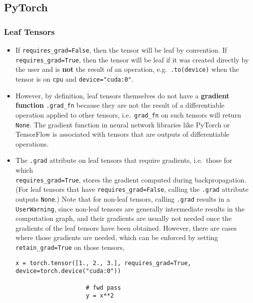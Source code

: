 \documentclass[12pt, a4paper]{article}
\numberwithin{equation}{section}
\theoremstyle{definition}
\theoremstyle{definition}
\begin{document}
	\subsection{PyTorch}
	
		\subsubsection{Leaf Tensors}
			
			\begin{itemize}
				\item If \texttt{requires\_grad=False}, then the tensor will be leaf by convention. If \texttt{requires\_grad=True}, then the tensor will be leaf if it was created directly by the user and is \textbf{not} the result of an operation, e.g.~\texttt{.to(device)} when the tensor is on \texttt{cpu} and \texttt{device="cuda:0"}.
				
				\item However, by definition, leaf tensors themselves do not have a \textbf{gradient function} \texttt{.grad\_fn} \mbox{because} they are not the result of a differentiable operation applied to other tensors, i.e.~\texttt{grad\_fn} on such tensors will return \texttt{None}. The gradient function in neural network libraries like PyTorch or TensorFlow is associated with tensors that are outputs of differentiable operations.
				
				\item The \texttt{.grad} attribute on leaf tensors that require gradients, i.e.~those for which \\ \texttt{requires\_grad=True}, stores the gradient computed during backpropagation. (For leaf tensors that have \texttt{requires\_grad=False}, calling the \texttt{.grad} attribute outputs \texttt{None}.) Note that for non-leaf tensors, calling \texttt{.grad} results in a \texttt{UserWarning}, since non-leaf tensors are generally intermediate results in the computation graph, and their gradients are usually not needed once the gradients of the leaf tensors have been obtained. However, there are cases where those gradients are needed, which can be enforced by setting \texttt{retain\_grad=True} on those tensors,
				
				\begin{lstlisting}[style=mystylepython, label=alg:retain_grad, xleftmargin=\parindent]
					x = torch.tensor([1., 2., 3.], requires_grad=True, device=torch.device("cuda:0"))
					
					# fwd pass
					y = x**2
					

\end{lstlisting}
\end{itemize}
\end{document}

